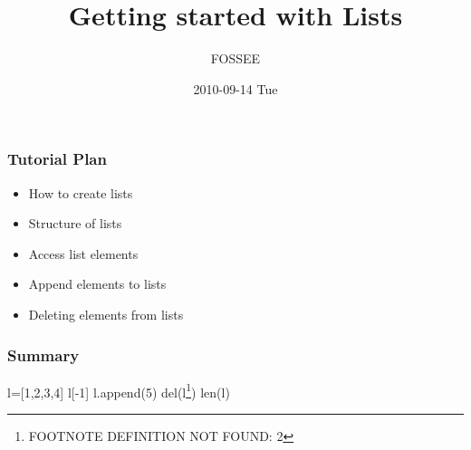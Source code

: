 \documentclass[presentation]{beamer}
\title{Getting started with Lists}
\author{FOSSEE}
\date{2010-09-14 Tue}
\begin{document}
\maketitle






\begin{frame}
\frametitle{Tutorial Plan}
\label{sec-1}
\begin{itemize}

\item How to create lists\\
\label{sec-1_1}%
\item Structure of lists\\
\label{sec-1_2}%
\item Access list elements\\
\label{sec-1_3}%
\item Append elements to lists\\
\label{sec-1_4}%
\item Deleting elements from lists\\
\label{sec-1_5}%
\end{itemize} %
\end{frame}
\begin{frame}
\frametitle{Summary}
\label{sec-2}


  l=[1,2,3,4]
  l[-1]
  l.append(5)
  del(l\footnote{FOOTNOTE DEFINITION NOT FOUND: 2 })
  len(l)
\end{frame}
\end{document}
